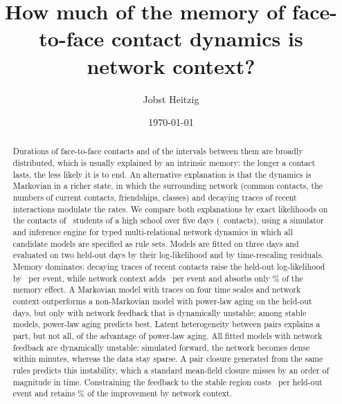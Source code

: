 \documentclass[aps,pre,reprint,groupedaddress,amsmath,amssymb,floatfix]{revtex4-2}
\begin{document}
\title{How much of the memory of face-to-face contact dynamics is network context?}

\author{Jobst Heitzig}

\date{\today}

\begin{abstract}
Durations of face-to-face contacts and of the intervals between them are broadly distributed, which is usually explained by an intrinsic memory: the longer a contact lasts, the less likely it is to end.
An alternative explanation is that the dynamics is Markovian in a richer state, in which the surrounding network (common contacts, the numbers of current contacts, friendships, classes) and decaying traces of recent interactions modulate the rates.
We compare both explanations by exact likelihoods on the contacts of \Students\ students of a high school over five days (\Contacts\ contacts), using a simulator and inference engine for typed multi-relational network dynamics in which all candidate models are specified as rule sets.
Models are fitted on three days and evaluated on two held-out days by their log-likelihood and by time-rescaling residuals.
Memory dominates: decaying traces of recent contacts raise the held-out log-likelihood by \GainMemoryAlone\ per event, while network context adds \GainNetwork\ per event and absorbs only \MemoryAbsorbed\% of the memory effect.
A Markovian model with traces on four time scales and network context outperforms a non-Markovian model with power-law aging on the held-out days, but only with network feedback that is dynamically unstable; among stable models, power-law aging predicts best. Latent heterogeneity between pairs explains a part, but not all, of the advantage of power-law aging.
All fitted models with network feedback are dynamically unstable: simulated forward, the network becomes dense within minutes, whereas the data stay sparse.
A pair closure generated from the same rules predicts this instability, which a standard mean-field closure misses by an order of magnitude in time.
Constraining the feedback to the stable region costs \StablePricePerEvent\ per held-out event and retains \StableRetained\% of the improvement by network context.
\end{abstract}

\maketitle













\end{document}
